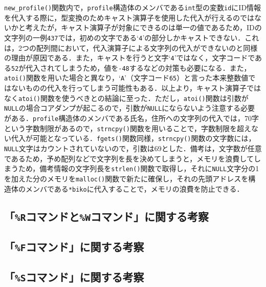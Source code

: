 \verb|new_profile()|関数内で，\verb|profile|構造体のメンバである\verb|int|型の変数\verb|id|にID情報を代入する際に，型変換のためキャスト演算子を使用した代入が行えるのではないかと考えたが，キャスト演算子が対象にできるのは単一の値であるため，IDの文字列の一例\verb|437|では，初めの文字である‘\verb|4|’の部分しかキャストできない．これは，2つの配列間において，代入演算子による文字列の代入ができないのと同様の理由が原因である．また，キャストを行うと文字‘\verb|4|’ではなく，文字コードである\verb|52|が代入されてしまうため，値を\verb|-48|するなどの対策も必要になる．また，\verb|atoi()|関数を用いた場合と異なり，‘\verb|A|’（文字コード\verb|65|）と言った本来整数値ではないものの代入を行ってしまう可能性もある．以上より，キャスト演算子ではなく\verb|atoi()|関数を使うべきとの結論に至った．ただし，\verb|atoi()|関数は引数が\verb|NULL|の場合コアダンプが起こるので，引数が\verb|NULL|にならないよう注意する必要がある\cite{www:label7}．\verb|profile|構造体のメンバである氏名，住所への文字列の代入では，70字という字数制限があるので，\verb|strncpy()|関数を用いることで，字数制限を超えない代入が可能となっている．\verb|fgets()|関数同様，\verb|strncpy()|関数の文字数には，\verb|NULL|文字はカウントされていないので，引数は69とした．備考は，文字数が任意であるため，予め配列などで文字列を長を決めてしまうと，メモリを浪費してしまうため，備考情報の文字列長を\verb|strlen()|関数で取得し，それに\verb|NULL|文字分の1を加えた分のメモリを\verb|malloc()|関数で新たに確保し，それの先頭アドレスを構造体のメンバである\verb|*biko|に代入することで，メモリの浪費を防止できる．

\subsection{「\texttt{\%R}コマンドと\texttt{\%W}コマンド」に関する考察}


\subsection{「\texttt{\%F}コマンド」に関する考察}


\subsection{「\texttt{\%S}コマンド」に関する考察}

